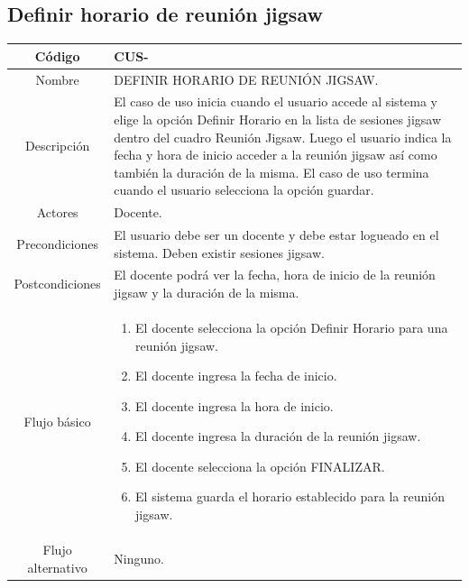 \subsection{Definir horario de reunión jigsaw}
\begin{longtable}{|c|L{10cm}|}
	\toprule[0.8mm]
	Código &  CUS-\casodeuso\\  \midrule
	Nombre &  DEFINIR HORARIO DE REUNIÓN JIGSAW.\\  \midrule
	Descripción & El caso de uso inicia cuando el usuario accede al sistema y elige la opción Definir Horario en la lista de sesiones jigsaw dentro del cuadro Reunión Jigsaw. Luego el usuario indica la fecha y hora de inicio acceder a la reunión jigsaw así como también la duración de la misma. El caso de uso termina cuando el usuario selecciona la opción guardar. \\  \midrule
	Actores &  Docente.\\  \midrule
	Precondiciones & El usuario debe ser un docente y debe estar logueado en el sistema. Deben existir sesiones jigsaw. \\  \midrule
	Postcondiciones & El docente podrá ver la fecha, hora de inicio de la reunión jigsaw y la duración de la misma. \\  \midrule
	Flujo básico & \begin{enumerate}
		\item El docente selecciona la opción Definir Horario para una reunión jigsaw.
		\item El docente ingresa la fecha de inicio.
		\item El docente ingresa la hora de inicio.
		\item El docente ingresa la duración de la reunión jigsaw.
		\item El docente selecciona la opción FINALIZAR.
		\item El sistema guarda el horario establecido para la reunión jigsaw.
	\end{enumerate}
	\\  \midrule
	Flujo alternativo & Ninguno. \\  \bottomrule[0.8mm]
\end{longtable}
\clearpage
